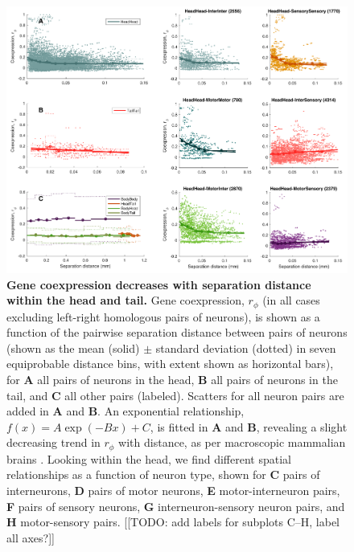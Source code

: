 \documentclass[10pt,letterpaper]{article}
\begin{document}
\begin{figure}[h]
\centering
    \includegraphics[width=1\textwidth]{DistanceCoexpression.pdf}
\caption{
\label{fig:S_distCoexp}
\textbf{Gene coexpression decreases with separation distance within the head and tail.}
Gene coexpression, $r_\phi$ (in all cases excluding left-right homologous pairs of neurons), is shown as a function of the pairwise separation distance between pairs of neurons (shown as the mean (solid) $\pm$ standard deviation (dotted) in seven equiprobable distance bins, with extent shown as horizontal bars), for \textbf{A} all pairs of neurons in the head, \textbf{B} all pairs of neurons in the tail, and \textbf{C} all other pairs (labeled).
Scatters for all neuron pairs are added in \textbf{A} and \textbf{B}.
An exponential relationship, $f(x) = A\exp(-Bx)+C$, is fitted in \textbf{A} and \textbf{B}, revealing a slight decreasing trend in $r_\phi$ with distance, as per macroscopic mammalian brains \cite{Fulcher:2016ck, Krienen:2016eq}.
Looking within the head, we find different spatial relationships as a function of neuron type, shown for \textbf{C} pairs of interneurons, \textbf{D} pairs of motor neurons, \textbf{E} motor-interneuron pairs, \textbf{F} pairs of sensory neurons, \textbf{G} interneuron-sensory neuron pairs, and \textbf{H} motor-sensory pairs.
[[TODO: add labels for subplots C--H, label all axes?]]
}
\end{figure}
\end{document}

